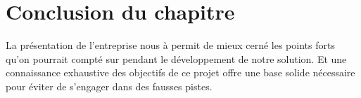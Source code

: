 \section{Conclusion du chapitre} 

La présentation de l'entreprise nous à permit de mieux cerné les points forts
qu'on pourrait compté sur pendant le développement de notre solution. Et une
connaissance exhaustive des objectifs de ce projet offre une base solide
nécessaire pour éviter de s’engager dans des fausses pistes.
